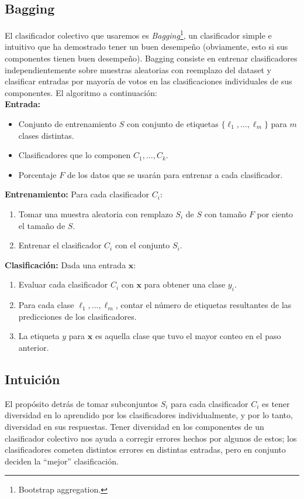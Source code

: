 \documentclass[spanish,11pt,letterpaper]{article}
\renewcommand{\vec}[1]{\mathbf{#1}}
\begin{document}
\subsection{Bagging}

El clasificador colectivo que usaremos es \textit{Bagging}\footnote{Bootstrap
aggregation.}, un clasificador simple e intuitivo que ha demostrado tener un buen
desempeño (obviamente, esto si sus componentes tienen buen desempeño). Bagging
consiste en entrenar clasificadores independientemente sobre muestras aleatorias
con reemplazo del dataset y clasificar entradas por mayoría de votos en las
clasificaciones individuales de sus componentes. El algoritmo a continuación:\\
\textbf{Entrada:}
\begin{itemize}
  \item Conjunto de entrenamiento $S$ con conjunto de etiquetas
  $\{\ell_1,\ldots,\ell_m\}$ para $m$ clases distintas.
  \item Clasificadores que lo componen $C_1,\ldots,C_k$.
  \item Porcentaje $F$ de los datos que se usarán para entrenar a cada clasificador.
\end{itemize}
\textbf{Entrenamiento:} Para cada clasificador $C_i$:
\begin{enumerate}
  \item Tomar una muestra aleatoria con remplazo $S_i$ de $S$ con tamaño $F$ por
  ciento el tamaño de $S$.
  \item Entrenar el clasificador $C_i$ con el conjunto $S_i$.
\end{enumerate}
\textbf{Clasificación:} Dada una entrada $\vec{x}$:
\begin{enumerate}
  \item Evaluar cada clasificador $C_i$ con $\vec{x}$ para obtener una clase $y_i$.
  \item Para cada clase $\ell_1,\ldots,\ell_m$, contar el número de etiquetas
  resultantes de las predicciones de los clasificadores.
  \item La etiqueta $y$ para $\vec{x}$ es aquella clase que tuvo el mayor conteo
  en el paso anterior.
\end{enumerate}

\subsection{Intuición}

El propósito detrás de tomar subconjuntos $S_i$ para cada clasificador $C_i$ es
tener diversidad en lo aprendido por los clasificadores individualmente, y por lo
tanto, diversidad en sus respuestas. Tener diversidad en los componentes de un
clasificador colectivo nos ayuda a corregir errores hechos por algunos de estos;
los clasificadores cometen distintos errores en distintas entradas, pero en conjunto
deciden la ``mejor'' clasificación.
\end{document}
